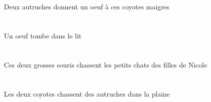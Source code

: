 \begin{exe}
\INDDuErgP{}   \autrucheDDuErgP{}    \DEMPlDatP{}   \maigreAPlP{}   \coyoteAPlDatP{}   \INDSgAbsP{}   \oeufDSgAbsP{}  \donnerVdPrsDSgP{}\\
\INDDuErgG{}   \autrucheDDuErgG{}    \DEMPlDatG{}   \maigreAPlG{}   \coyoteAPlDatG{}   \INDSgAbsG{}   \oeufDSgAbsG{}  \donnerVdPrsDSgG{}\\
Deux autruches donnent un oeuf à ces coyotes maigres
\ex\glll
\INDSgAbs{}   \oeufDSgAbs{}    \DEFSgObl{}   \litDSgObl{}   \DANS{}  \tomberViPrsDSg{}\\
\INDSgAbsP{}   \oeufDSgAbsP{}    \DEFSgOblP{}   \litDSgOblP{}   \DANSP{}  \tomberViPrsDSgP{}\\
\INDSgAbsG{}   \oeufDSgAbsG{}    \DEFSgOblG{}   \litDSgOblG{}   \DANSG{}  \tomberViPrsDSgG{}\\
Un oeuf tombe dans le lit
\ex\glll
\DEMDuErg{}   \grosADu{}   \sourisADuErg{}   \DEFPlAbs{}    \DEFPlObl{}    \INDSgObl{}   \NicoleDSgObl{}   \DE{}   \filleCPlObl{}   \DE{}   \petitDPl{}   \chatDPlAbs{}  \chasserVtPrsDPl{}\\
\DEMDuErgP{}   \grosADuP{}   \sourisADuErgP{}   \DEFPlAbsP{}    \DEFPlOblP{}    \INDSgOblP{}   \NicoleDSgOblP{}   \DEP{}   \filleCPlOblP{}   \DEP{}   \petitDPlP{}   \chatDPlAbsP{}  \chasserVtPrsDPlP{}\\
\DEMDuErgG{}   \grosADuG{}   \sourisADuErgG{}   \DEFPlAbsG{}    \DEFPlOblG{}    \INDSgOblG{}   \NicoleDSgOblG{}   \DEG{}   \filleCPlOblG{}   \DEG{}   \petitDPlG{}   \chatDPlAbsG{}  \chasserVtPrsDPlG{}\\
Ces deux grosses souris chassent les petits chats des filles de Nicole
\ex\glll
\DEFSgObl{}   \plaineCSgObl{}   \DANS{}   \DEFDuErg{}   \coyoteADuErg{}   \INDPlAbs{}   \autrucheDPlAbs{}  \chasserVtPrsDPl{}\\
\DEFSgOblP{}   \plaineCSgOblP{}   \DANSP{}   \DEFDuErgP{}   \coyoteADuErgP{}   \INDPlAbsP{}   \autrucheDPlAbsP{}  \chasserVtPrsDPlP{}\\
\DEFSgOblG{}   \plaineCSgOblG{}   \DANSG{}   \DEFDuErgG{}   \coyoteADuErgG{}   \INDPlAbsG{}   \autrucheDPlAbsG{}  \chasserVtPrsDPlG{}\\
Les deux coyotes chassent des autruches dans la plaine
\ex\glll
\DEFPlAbs{}   \noirBPl{}   \theBPlAbs{}    \DEFPlObl{}   \coussinAPlObl{}   \SOUS{}  \tomberViPrsBPl{}\\
\DEFPlAbsP{}   \noirBPlP{}   \theBPlAbsP{}    \DEFPlOblP{}   \coussinAPlOblP{}   \SOUSP{}  \tomberViPrsBPlP{}\\
\DEFPlAbsG{}   \noirBPlG{}   \theBPlAbsG{}    \DEFPlOblG{}   \coussinAPlOblG{}   \SOUSG{}  \tomberViPrsBPlG{}\\

\end{exe}
